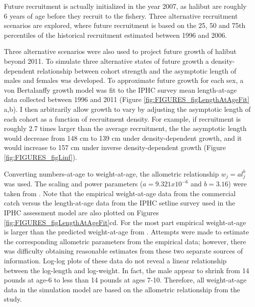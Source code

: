 Future recruitment is actually initialized in the year 2007, as halibut are roughly 6 years of age before they recruit to the fishery. Three alternative recruitment scenarios are explored, where future recruitment is based on the 25, 50 and 75th percentiles of the historical recruitment estimated between 1996 and 2006.

Three alternative scenarios were also used to project future growth of halibut beyond 2011.  To simulate three alternative states of future growth a density-dependent relationship between cohort strength and the asymptotic length of males and females was developed.  To approximate future growth for each sex, a von Bertalanffy growth model was fit to the IPHC survey mean length-at-age data collected between 1996 and 2011 (Figure \ref{fig:FIGURES_figLengthAtAgeFit} a,b).  I then arbitrarily allow growth to vary by adjusting the asymptotic length of each cohort as a function of recruitment density. For example, if recruitment is roughly 2.7 times larger than the average recruitment, the the asymptotic length would decrease from 148 cm to 139 cm under density-dependent growth, and it would increase to 157 cm under inverse density-dependent growth (Figure \ref{fig:FIGURES_figLinf}).  

Converting numbers-at-age to weight-at-age, the allometric relationship $w_j= a l_j^b$ was used.  The scaling and power parameters ($a=9.321x10^{-6}$ and $b=3.16$) were taken from \cite{courcellesre}.  Note that the empirical weight-at-age data from the commercial catch versus the length-at-age data from the IPHC setline survey used in the IPHC assessment model are also plotted on Figures \ref{fig:FIGURES_figLengthAtAgeFit}cd. For the most part empirical weight-at-age is larger than the predicted weight-at-age from \cite{courcellesre}.  Attempts were made to estimate the corresponding allometric parameters from the empirical data; however, there was difficulty obtaining reasonable estimates from these two separate sources of information.  Log-log plots of these data do not reveal a linear relationship between the log-length and log-weight.  In fact, the male appear to shrink from 14 pounds at age-6 to less than 14 pounds at ages 7-10.  Therefore, all weight-at-age data in the simulation model are based on the allometric relationship from the \cite{courcellesre} study.
   
